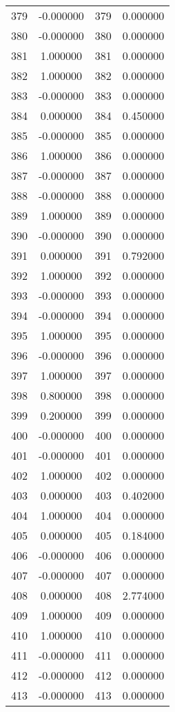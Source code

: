 \documentclass[12pt]{article}
\begin{document}
\begin{longtable}{@{}cccc@{}}
379 & -0.000000 & 379 & 0.000000 \\
380 & -0.000000 & 380 & 0.000000 \\
381 & 1.000000 & 381 & 0.000000 \\
382 & 1.000000 & 382 & 0.000000 \\
383 & -0.000000 & 383 & 0.000000 \\
384 & 0.000000 & 384 & 0.450000 \\
385 & -0.000000 & 385 & 0.000000 \\
386 & 1.000000 & 386 & 0.000000 \\
387 & -0.000000 & 387 & 0.000000 \\
388 & -0.000000 & 388 & 0.000000 \\
389 & 1.000000 & 389 & 0.000000 \\
390 & -0.000000 & 390 & 0.000000 \\
391 & 0.000000 & 391 & 0.792000 \\
392 & 1.000000 & 392 & 0.000000 \\
393 & -0.000000 & 393 & 0.000000 \\
394 & -0.000000 & 394 & 0.000000 \\
395 & 1.000000 & 395 & 0.000000 \\
396 & -0.000000 & 396 & 0.000000 \\
397 & 1.000000 & 397 & 0.000000 \\
398 & 0.800000 & 398 & 0.000000 \\
399 & 0.200000 & 399 & 0.000000 \\
400 & -0.000000 & 400 & 0.000000 \\
401 & -0.000000 & 401 & 0.000000 \\
402 & 1.000000 & 402 & 0.000000 \\
403 & 0.000000 & 403 & 0.402000 \\
404 & 1.000000 & 404 & 0.000000 \\
405 & 0.000000 & 405 & 0.184000 \\
406 & -0.000000 & 406 & 0.000000 \\
407 & -0.000000 & 407 & 0.000000 \\
408 & 0.000000 & 408 & 2.774000 \\
409 & 1.000000 & 409 & 0.000000 \\
410 & 1.000000 & 410 & 0.000000 \\
411 & -0.000000 & 411 & 0.000000 \\
412 & -0.000000 & 412 & 0.000000 \\
413 & -0.000000 & 413 & 0.000000 \\

\end{longtable}
\end{document}
